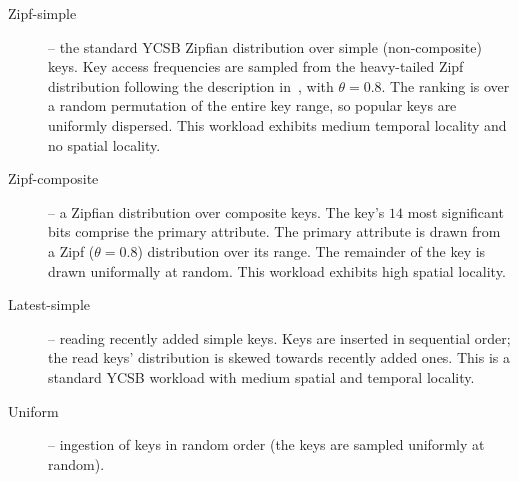 \begin{description}
\item [Zipf-simple] -- the standard YCSB Zipfian distribution over simple (non-composite) keys. 
Key access frequencies are sampled from the heavy-tailed Zipf distribution 
following the description in~\cite{Gray:1994:QGB:191839.191886}, with $\theta = 0.8$. 
The ranking is over a random permutation of the entire key range, so popular keys are uniformly dispersed.
This workload exhibits 
medium temporal locality %
and no spatial locality. 

\item [Zipf-composite]  -- a Zipfian distribution over composite keys. 
The key's $14$ most significant bits comprise the primary attribute. 
The primary attribute is drawn from a Zipf ($\theta=0.8$) distribution over its range. The remainder of the key is drawn uniformally at random.
This workload exhibits high spatial locality. 

\item [Latest-simple] -- reading  recently added simple keys. 
Keys are inserted in sequential  order; the read keys' distribution is skewed towards recently added ones. 
This is a 
standard YCSB workload with medium spatial and temporal locality.%

\item [Uniform] -- ingestion of keys in random order (the keys are sampled uniformly at random). 

\end{description}

